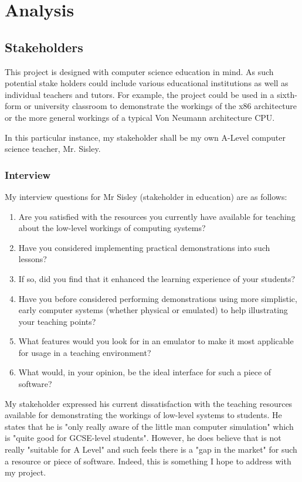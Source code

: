 \section{Analysis}

\subsection{Stakeholders}
    This project is designed with computer science education in mind. As such potential stake holders could include various educational institutions as well as individual teachers and tutors. For example, the project could be used in a sixth-form or university classroom to demonstrate the workings of the x86 architecture or the more general workings of a typical Von Neumann architecture CPU.

    In this particular instance, my stakeholder shall be my own A-Level computer science teacher, Mr. Sisley.

    \subsubsection{Interview} \label{sec:interview}
        My interview questions for Mr Sisley (stakeholder in education) are as follows:
        \begin{enumerate}
            \item Are you satisfied with the resources you currently have available for teaching about the low-level workings of computing systems?
            \item Have you considered implementing practical demonstrations into such lessons?
            \item If so, did you find that it enhanced the learning experience of your students?
            \item Have you before considered performing demonstrations using more simplistic, early computer systems (whether physical or emulated) to help illustrating your teaching points?
            \item What features would you look for in an emulator to make it most applicable for usage in a teaching environment?
            \item What would, in your opinion, be the ideal interface for such a piece of software?
        \end{enumerate}


        My stakeholder expressed his current dissatisfaction with the teaching resources available for demonstrating the workings of low-level systems to students. He states that he is "only really aware of the little man computer simulation" which is "quite good for GCSE-level students". However, he does believe that is not really "suitable for A Level" and such feels there is a "gap in the market" for such a resource or piece of software. Indeed, this is something I hope to address with my project.

